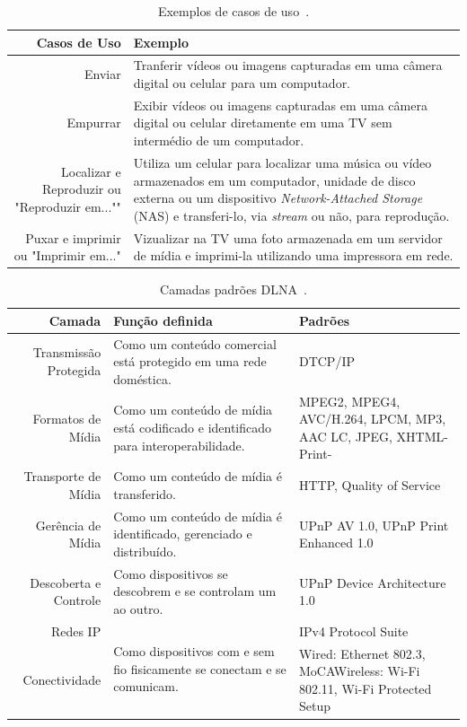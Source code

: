 \begin{table}
	\begin{center}
		\begin{tabular}{rl}
		\hline
		\textbf{Casos de Uso} & \textbf{Exemplo}																\\
		\hline
		Enviar & Tranferir vídeos ou imagens capturadas em uma câmera digital ou celular para um computador.	\\
		\hline
		Empurrar & Exibir vídeos ou imagens capturadas em uma câmera digital ou celular diretamente em uma TV sem intermédio de um computador. \\
		\hline
		Localizar e Reproduzir ou "Reproduzir em..."" & Utiliza um celular para localizar uma música ou vídeo armazenados em um computador, unidade de disco externa ou um dispositivo \emph{Network-Attached Storage} (NAS) e transferi-lo, via \emph{stream} ou não, para reprodução. \\
		\hline
		Puxar e imprimir ou "Imprimir em..." & Vizualizar na TV uma foto armazenada em um servidor de mídia e imprimi-la utilizando uma impressora em rede. \\
		\hline
		\end{tabular}
	\end{center}
	\caption{Exemplos de casos de uso~\cite{dlnahdvideostreaming}.}
	\label{tab:casosdeuso_dlna}
\end{table}

\begin{table}
	\begin{center}
		\begin{tabular}{rll}
		\hline
		\textbf{Camada} & \textbf{Função definida} & \textbf{Padrões}				\\
		\hline
		Transmissão Protegida & Como um conteúdo comercial está protegido em uma rede doméstica. & DTCP/IP \\
		\hline
		Formatos de Mídia & Como um conteúdo de mídia está codificado e identificado para interoperabilidade. & MPEG2, MPEG4, AVC/H.264, LPCM, MP3, AAC LC, JPEG, XHTML-Print- \\
		\hline
		Transporte de Mídia & Como um conteúdo de mídia é transferido. & HTTP, Quality of Service \\
		\hline
		Gerência de Mídia & Como um conteúdo de mídia é identificado, gerenciado e distribuído. & UPnP AV 1.0, UPnP Print Enhanced 1.0 \\
		\hline
		Descoberta e Controle & Como dispositivos se descobrem e se controlam um ao outro. & UPnP Device Architecture 1.0 \\
		\hline
		Redes IP & \multirow{2}{*}{Como dispositivos com e sem fio fisicamente se conectam e se comunicam.} & IPv4 Protocol Suite \\
		Conectividade & & Wired: Ethernet 802.3, MoCAWireless: Wi-Fi 802.11, Wi-Fi Protected Setup \\
		\hline
		\end{tabular}
	\end{center}
	\caption{Camadas padrões DLNA~\cite{dlnahdvideostreaming}.}
	\label{tab:camadaspadroes_dlna}
\end{table}
